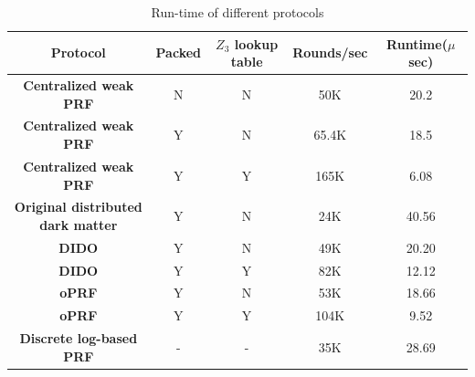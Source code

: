 \begin{table}[htbp]
	\begin{center}
		\begin{tabular}{|c|c|c|c|c|}
			\hline
			\textbf{Protocol} & \textbf{Packed }  &  \textbf{$Z_3$ lookup table} & \textbf{Rounds/sec} & Runtime($\mu$ sec)\\
			\hline
			\hline
			\textbf{Centralized weak PRF}  & N  & N  &  50K&	20.2 \\
			\hline
			\textbf{Centralized weak PRF} & Y  &  N & 65.4K &	18.5 \\
			\hline
			\textbf{Centralized weak PRF} & Y  &  Y & 165K &	6.08 \\
			\hline
			\textbf{Original distributed dark matter} & Y & N &  24K & 40.56	\\
			\hline
			\textbf{DIDO} & Y & N & 49K &  20.20\\
			\hline
			\textbf{DIDO} & Y & Y & 82K &  12.12	\\
			\hline
			\textbf{oPRF} & Y & N & 53K &  18.66	\\
			\hline
			\textbf{oPRF} & Y & Y & 104K &  9.52	\\
			\hline
			\textbf{Discrete log-based PRF} &  - & - & 35K & 28.69 \\
			\hline
			
		\end{tabular}
		
		\vspace{-1mm}
		\caption{Run-time of different protocols}
		\label{RuntimeTable}
	\end{center}
	\vspace{-5mm}
\end{table}







